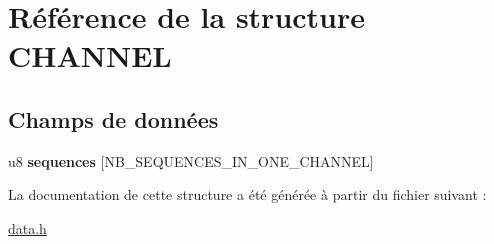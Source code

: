 \hypertarget{struct_c_h_a_n_n_e_l}{
\section{Référence de la structure CHANNEL}
\label{struct_c_h_a_n_n_e_l}
}
\subsection*{Champs de données}
\begin{DoxyCompactItemize}
\item 
\hypertarget{struct_c_h_a_n_n_e_l_aa5f01c6f8df8a2e89e6896d79ddd9446}{
u8 {\bfseries sequences} \mbox{[}NB\_\-SEQUENCES\_\-IN\_\-ONE\_\-CHANNEL\mbox{]}}
\label{struct_c_h_a_n_n_e_l_aa5f01c6f8df8a2e89e6896d79ddd9446}

\end{DoxyCompactItemize}


La documentation de cette structure a été générée à partir du fichier suivant :\begin{DoxyCompactItemize}
\item 
\hyperlink{data_8h}{data.h}\end{DoxyCompactItemize}
